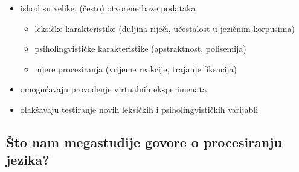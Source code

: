 \documentclass[aspectratio=169]{beamer}
\newcommand{\tinycitep}[1]{%
    \bgroup
    \scriptsize
    \citep{#1}
    \egroup}
\begin{document}
\begin{frame}
    \begin{itemize}
        \item ishod su velike, (često) otvorene baze podataka
            \begin{itemize}
                \item leksičke karakteristike (duljina riječi, učestalost
                    u jezičnim korpusima)
                \item psiholingvističke karakteristike (apstraktnost,
                    polisemija)
                \item mjere procesiranja (vrijeme reakcije, trajanje fiksacija)
            \end{itemize}

        \pause

        \item omogućavaju provođenje virtualnih eksperimenata
            \tinycitep{kupermanVirtualExperimentsMegastudies2015}


        \pause

        \item olakšavaju testiranje novih leksičkih i psiholingvističkih
            varijabli \tinycitep{yarkoniMovingColtheartNew2008}
    \end{itemize}
\end{frame}

\subsection[Što nam megastudije govore?]%
    {Što nam megastudije govore o procesiranju jezika?}
\end{document}
